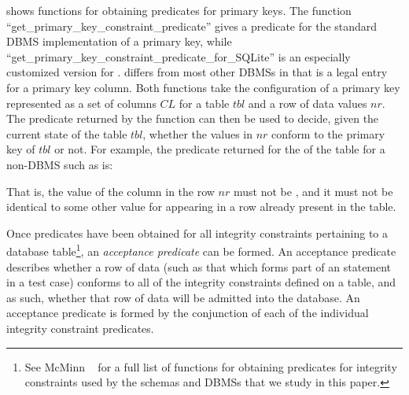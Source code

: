 \begin{sloppypar}
 shows functions for obtaining predicates for primary keys. The function
``get\_primary\_key\_constraint\_predicate'' gives a predicate for the standard DBMS implementation of a primary key,
while ``get\_primary\_key\_constraint\_predicate\_for\_SQLite'' is an especially customized version for \SQLite. \SQLite
differs from most other DBMSs in that \NULL is a legal entry for a primary key column. Both functions take the
configuration of a primary key represented as a set of columns $CL$ for a table $tbl$ and a row of data values $nr$. The
predicate returned by the function can then be used to decide, given the current state of the table $tbl$, whether the
values in $nr$ conform to the primary key of $tbl$ or not. For example, the predicate returned for the \PK of the
 table for a non-\SQLite DBMS such as \Postgres is:
\end{sloppypar}

\vspace{-.6em}
\begin{center}
\end{center}
\vspace{-.6em}

\noindent That is, the value of the  column in the row $nr$ must not be \NULL, and it must not be identical to some other value for  appearing in a row already present in the  table.



Once predicates have been obtained for all integrity constraints pertaining to a database table\footnote{{\scriptsize See McMinn \etal~\cite{McMinn2015} for a full list of functions for obtaining predicates for integrity constraints used by the schemas and DBMSs that we study in this paper.}}, an {\it acceptance predicate} can be formed. An acceptance predicate describes whether a row of data (such as that which forms part of an \INSERT statement in a test case) conforms to all of the integrity constraints defined on a table, and as such, whether that row of data will be admitted into the database. An acceptance predicate is formed by the conjunction of each of the individual integrity constraint predicates.

